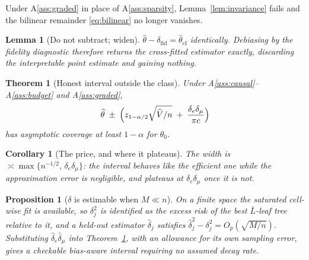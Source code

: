 \documentclass[11pt]{article}
\theoremstyle{plain}
\newtheorem{theorem}{Theorem}
\newtheorem{lemma}{Lemma}
\newtheorem{corollary}{Corollary}
\newtheorem{proposition}{Proposition}
\theoremstyle{definition}
\theoremstyle{remark}
\newcommand{\thetahat}{\widehat{\theta}}
\newcommand{\Vhat}{\widehat{V}}
\newcommand{\dhat}{\widehat{\delta}}
\begin{document}
Under A\ref{ass:graded} in place of A\ref{ass:sparsity},
Lemma~\ref{lem:invariance} fails and the bilinear remainder
\eqref{eq:bilinear} no longer vanishes.

\begin{lemma}[Do not subtract; widen]\label{lem:no-subtract}
$\thetahat-\delta_{\mathrm{fid}}=\thetahat_{\mathrm{cf}}$ identically. Debiasing
by the fidelity diagnostic therefore returns the cross-fitted estimator exactly,
discarding the interpretable point estimate and gaining nothing.
\end{lemma}

\begin{theorem}[Honest interval outside the class]\label{thm:honest}
Under A\ref{ass:causal}--A\ref{ass:budget} and A\ref{ass:graded},
\[
  \thetahat \;\pm\; \Bigl(z_{1-\alpha/2}\sqrt{\Vhat/n}
    \;+\; \frac{\delta_e\delta_\mu}{\pi c}\Bigr)
\]
has asymptotic coverage at least $1-\alpha$ for $\theta_0$.
\end{theorem}

\begin{corollary}[The price, and where it plateaus]\label{cor:width}
The width is $\asymp\max\{n^{-1/2},\,\delta_e\delta_\mu\}$: the interval behaves
like the efficient one while the approximation error is negligible, and
plateaus at $\delta_e\delta_\mu$ once it is not.
\end{corollary}

\begin{proposition}[$\delta$ is estimable when $M\ll n$]\label{prop:estimable}
On a finite space the saturated cell-wise fit is available, so
$\delta_j^2$ is identified as the excess risk of the best $\bar L$-leaf tree
relative to it, and a held-out estimator $\dhat_j$ satisfies
$\dhat_j^2-\delta_j^2=O_p(\sqrt{M/n})$. Substituting $\dhat_e\dhat_\mu$ into
Theorem~\ref{thm:honest}, with an allowance for its own sampling error, gives a
\emph{checkable} bias-aware interval requiring no assumed decay rate.
\end{proposition}
\end{document}
